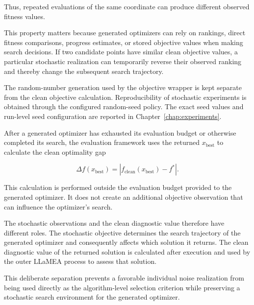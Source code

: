 Thus, repeated evaluations of the same coordinate can produce different
observed fitness values.

This property matters because generated optimizers can rely on rankings,
direct fitness comparisons, progress estimates, or stored objective values
when making search decisions. If two candidate points have similar clean
objective values, a particular stochastic realization can temporarily reverse
their observed ranking and thereby change the subsequent search trajectory.

The random-number generation used by the objective wrapper is kept separate
from the clean objective calculation. Reproducibility of stochastic
experiments is obtained through the configured random-seed policy. The exact
seed values and run-level seed configuration are reported in
Chapter~\ref{chap:experiments}.



After a generated optimizer has exhausted its evaluation budget or otherwise
completed its search, the evaluation framework uses the returned
$x_{\mathrm{best}}$ to calculate the clean optimality gap

\begin{equation}
\Delta f(x_{\mathrm{best}})
=
\left|
f_{\mathrm{clean}}(x_{\mathrm{best}}) - f^*
\right|.
\label{eq:clean_optimality_gap}
\end{equation}

This calculation is performed outside the evaluation budget provided to the
generated optimizer. It does not create an additional objective observation
that can influence the optimizer's search.

The stochastic observations and the clean diagnostic value therefore have
different roles. The stochastic objective determines the search trajectory of
the generated optimizer and consequently affects which solution it returns.
The clean diagnostic value of the returned solution is calculated after
execution and used by the outer LLaMEA process to assess that solution.

This deliberate separation prevents a favorable individual noise realization
from being used directly as the algorithm-level selection criterion while
preserving a stochastic search environment for the generated optimizer.


